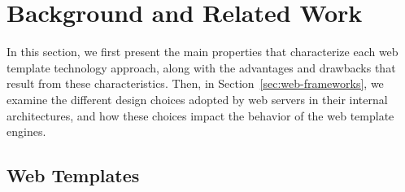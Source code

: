 \documentclass[software,article,accept,pdftex,moreauthors]{Definitions/mdpi}
\begin{document}

\section{Background and Related Work}\label{s2}

In this section, we first present the main properties that characterize each web
template technology approach, along with the advantages and drawbacks that result
from these characteristics. Then, in Section~\ref{sec:web-frameworks}, we examine the different
design choices adopted by web servers in their internal architectures, and how
these choices impact the behavior of the web template engines.

\subsection{Web Templates}\label{s2.1}
\end{document}
